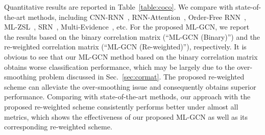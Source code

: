 \documentclass[10pt,twocolumn,letterpaper]{article}
\begin{document}
Quantitative results are reported in Table~\ref{table:coco}. We compare with state-of-the-art methods, including CNN-RNN~\cite{cnn-rnn}, RNN-Attention~\cite{rnn_attention}, Order-Free RNN~\cite{order}, ML-ZSL~\cite{ml-zsl}, SRN~\cite{srn}, Multi-Evidence~\cite{multi_evidence}, etc. For the proposed ML-GCN, we report the results based on the binary correlation matrix (``ML-GCN (Binary)'')  and the re-weighted correlation matrix (``ML-GCN (Re-weighted)''), respectively. It is obvious to see that our ML-GCN method based on the binary correlation matrix obtains worse classification performance, which may be largely due to the over-smoothing problem discussed in Sec.~\ref{sec:cormat}. The proposed re-weighted scheme can alleviate the over-smoothing issue and consequently obtains superior performance. Comparing with state-of-the-art methods, our approach with the proposed re-weighted scheme consistently performs better under almost all metrics, which shows the effectiveness of our proposed ML-GCN as well as its corresponding re-weighted scheme.
\end{document}
